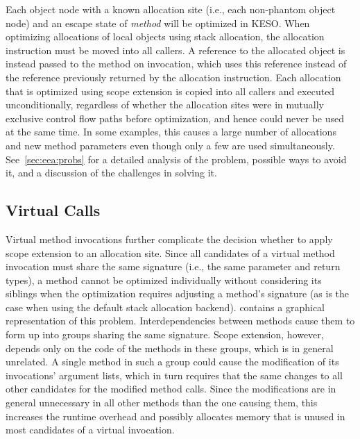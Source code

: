 			Each object node with a known allocation site (i.e., each non-phantom object node) and an escape state of
			\emph{method} will be optimized in KESO\@. When optimizing allocations of local objects using stack allocation,
			the allocation instruction must be moved into all callers. A reference to the allocated object is instead passed
			to the method on invocation, which uses this reference instead of the reference previously returned by the
			allocation instruction. Each allocation that is optimized using scope extension is copied into all callers and
			executed unconditionally, regardless of whether the allocation sites were in mutually exclusive control flow paths
			before optimization, and hence could never be used at the same time. In some examples, this causes a large number
			of allocations and new method parameters even though only a few are used simultaneously. See~\cref{sec:eea:probs}
			for a detailed analysis of the problem, possible ways to avoid it, and a discussion of the challenges in solving
			it.

		\subsection{Virtual Calls}
			\label{sub:eea:analysis:virtual}
			Virtual method invocations further complicate the decision whether to apply scope extension to an allocation site.
			Since all candidates of a virtual method invocation must share the same signature (i.e., the same parameter and
			return types), a method cannot be optimized individually without considering its siblings when the optimization
			requires adjusting a method's signature (as is the case when using the default stack allocation backend).
			 contains a graphical representation of this problem. Interdependencies between
			methods cause them to form up into groups sharing the same signature. Scope extension, however, depends only on
			the code of the methods in these groups, which is in general unrelated. A single method in such a group could
			cause the modification of its invocations' argument lists, which in turn requires that the same changes to all
			other candidates for the modified method calls. Since the modifications are in general unnecessary in all other
			methods than the one causing them, this increases the runtime overhead and possibly allocates memory that is
			unused in most candidates of a virtual invocation.

